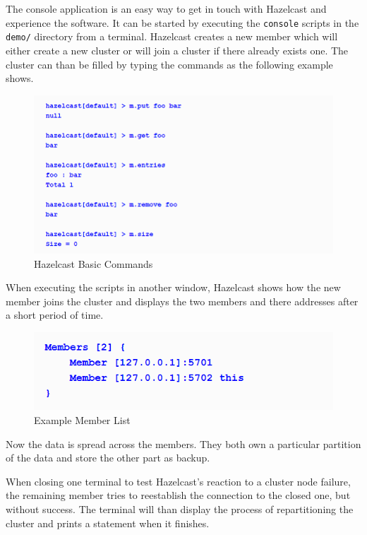 The console application is an easy way to get in touch with Hazelcast and experience the software. It can be started by executing the \texttt{console} scripts in the \texttt{demo/} directory from a terminal. Hazelcast creates a new member which will either create a new cluster or will join a cluster if there already exists one. The cluster can than be filled by typing the commands as the following example shows.
\begin{flushleft}
\begin{figure}[h]
    \includegraphics{img/hazelcastPut.PNG} 
    \caption{Hazelcast Basic Commands \parencite{johns2015}}
\end{figure}
\end{flushleft}
When executing the scripts in another window, Hazelcast shows how the new member joins the cluster and displays the two members and there addresses after a short period of time.
\begin{flushleft}
\begin{figure}[h]
    \includegraphics{img/hazelcastMembers.PNG}
    \caption{Example Member List \parencite{johns2015}}
\end{figure}
\end{flushleft}
Now the data is spread across the members. They both own a particular partition of the data and store the other part as backup.

When closing one terminal to test Hazelcast's reaction to a cluster node failure, the remaining member tries to reestablish the connection to the closed one, but without success. The terminal will than display the process of repartitioning the cluster and prints a statement when it finishes.
